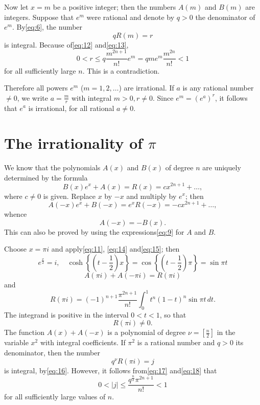 Now let $x = m$ be a positive integer; then the numbers $A(m)$ and $B(m)$ are integers. Suppose that $e^m$ were rational and denote by $q > 0$ the denominator of $e^m$. By\eqref{eq:6}, the number
\[ q R(m) = r \]
is integral. Because of\eqref{eq:12} and\eqref{eq:13},
\[ 0 < r \leq q \frac{m^{2n+1}}{n!} e^m = q m e^m \frac{m^{2n}}{n!} < 1 \]
for all sufficiently large $n$. This is a contradiction.

Therefore all powers $e^m$ ($m=1,2,\dots$) are irrational. If $a$ is any rational number $\neq 0$, we write $a=\frac{m}{r}$ with integral $m>0, r \neq 0$. Since $e^m=(e^a)^r$, it follows that $e^a$ is irrational, for all rational $a \neq 0$.

\section{The irrationality of $\pi$}

We know that the polynomials $A(x)$ and $B(x)$ of degree $n$ are uniquely determined by the formula
\begin{equation} B(x)e^{x} + A(x) = R(x) = cx^{2n+1} + \dots, \tag{14}\label{eq:14} \end{equation}
where $c \neq 0$ is given. Replace $x$ by $-x$ and multiply by $e^{x}$; then
\[ A(-x)e^{x} + B(-x) = e^{x}R(-x) = -cx^{2n+1} + \dots, \]
whence
\begin{equation} A(-x) = -B(x). \tag{15}\label{eq:15} \end{equation}
This can also be proved by using the expressions\eqref{eq:9} for $A$ and $B$.

Choose $x=\pi i$ and apply\eqref{eq:11}, \eqref{eq:14} and\eqref{eq:15}; then
\[ e^{\frac{x}{2}} = i, \quad \cosh \left\{\left(t-\frac{1}{2}\right)x\right\} = \cos \left\{\left(t-\frac{1}{2}\right)\pi\right\} = \sin \pi t \]
\begin{equation} A(\pi i) + A(-\pi i) = R(\pi i) \tag{16}\label{eq:16} \end{equation}
and
\begin{equation} R(\pi i) = (-1)^{n+1} \frac{\pi^{2n+1}}{n!} \int_0^1 t^n (1-t)^n \sin \pi t \, dt. \tag{17}\label{eq:17} \end{equation}
The integrand is positive in the interval $0 < t < 1$, so that
\[ R(\pi i) \neq 0. \]
The function $A(x) + A(-x)$ is a polynomial of degree $\nu = \left[\frac{n}{2}\right]$ in the variable $x^2$ with integral coefficients. If $\pi^2$ is a rational number and $q > 0$ its denominator, then the number
\begin{equation} q^{\nu} R(\pi i) = j \tag{18}\label{eq:18} \end{equation}
is integral, by\eqref{eq:16}. However, it follows from\eqref{eq:17} and\eqref{eq:18} that
\[ 0 < |j| \leq \frac{q^{\frac{n}{2}} \pi^{2n+1}}{n!} < 1 \]
for all sufficiently large values of $n$.

